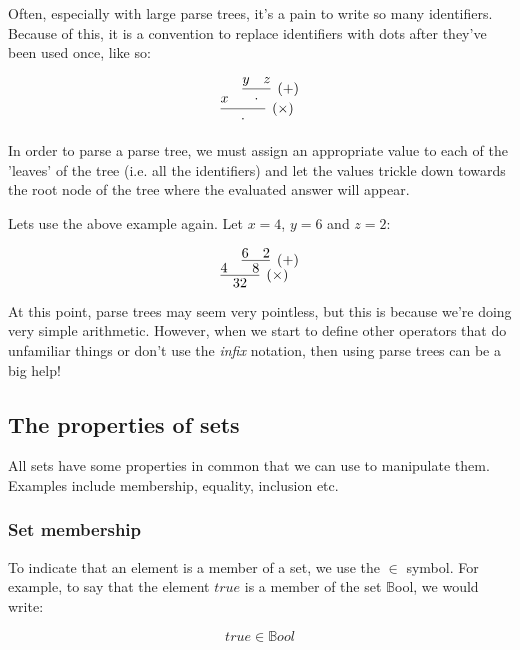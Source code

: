 Often, especially with large parse trees, it's a pain to write so many
identifiers. Because of this, it is a convention to replace identifiers with
dots after they've been used once, like so:

\begin{dmath}
	\infer[(\times)]{\parsetreedot} {
		x
		&
		\infer[(+)]{\parsetreedot} {
			y
			&
			z
		}
	}
\end{dmath}

In order to parse a parse tree, we must assign an appropriate value to each of
the 'leaves' of the tree (i.e. all the identifiers) and let the values trickle
down towards the root node of the tree where the evaluated answer will appear.

Lets use the above example again. Let $x = 4$, $y = 6$ and $z = 2$:

\begin{dmath}
	\infer[(\times)]{32} {
		4
		&
		\infer[(+)]{8} {
			6
			&
			2
		}
	}
\end{dmath}

At this point, parse trees may seem very pointless, but this is because we're
doing very simple arithmetic. However, when we start to define other operators
that do unfamiliar things or don't use the {\it infix} notation,
then using parse trees can be a big help!


\subsection{The properties of sets}
\label{subsec:properties_of_sets}

All sets have some properties in common that we can use to manipulate them.
Examples include membership, equality, inclusion etc.

\subsubsection{Set membership}

To indicate that an element is a member of a set, we use the $\in$ symbol. For
example, to say that the element $true$ is a member of the set $\mathbb{B}$ool,
we would write:

\begin{dmath}
	true \in \mathbb{B}ool
\end{dmath}

